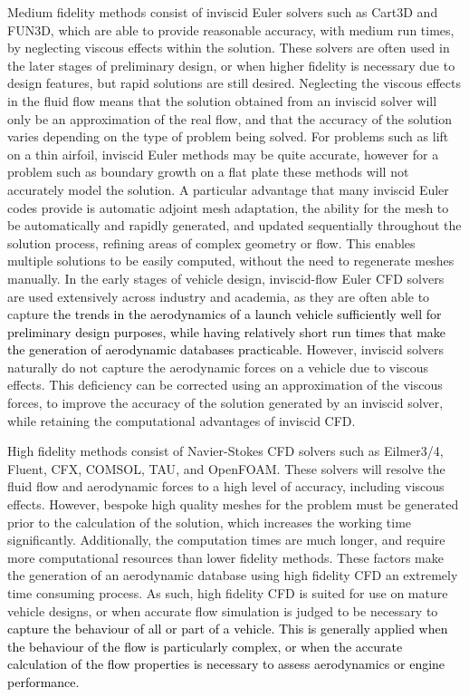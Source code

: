 Medium fidelity methods consist of inviscid Euler solvers such as Cart3D\cite{CART3D} and FUN3D\cite{fun3d}, which are able to provide reasonable accuracy, with medium run times, by neglecting viscous effects within the solution. These solvers are often used in the later stages of preliminary design, or when higher fidelity is necessary due to design features, but rapid solutions are still desired.  Neglecting the viscous effects in the fluid flow means that the solution obtained from an inviscid solver will only be an approximation of the real flow, and that the accuracy of the solution varies depending on the type of problem being solved. For problems such as lift on a thin airfoil, inviscid Euler methods may be quite accurate, however for a problem such as boundary growth on a flat plate these methods will not accurately model the solution\cite{NASAEuler}. A particular advantage that many inviscid Euler codes provide is automatic adjoint mesh adaptation, the ability for the mesh to be automatically and rapidly generated, and updated sequentially throughout the solution process, refining areas of complex geometry or flow. This enables multiple solutions to be easily computed, without the need to regenerate meshes manually. In the early stages of vehicle design, inviscid-flow Euler CFD solvers are used extensively across industry and academia\cite{Almosnino2016}, as they are often able to capture \textcolor{black}{the trends in the aerodynamics of a launch vehicle sufficiently well for preliminary design purposes, while having relatively short run times that make the generation of aerodynamic databases practicable.}
 However, inviscid solvers naturally do not capture the aerodynamic forces on a vehicle due to viscous effects. This deficiency can be corrected using an approximation of the viscous forces, to improve the accuracy of the solution generated by an inviscid solver, while retaining the computational advantages of inviscid CFD\cite{Ward2018}. 

High fidelity methods consist of Navier-Stokes CFD solvers such as Eilmer3/4\cite{Gollan2013b}, Fluent\cite{Ansys2014}, CFX\cite{CFX}, COMSOL\cite{comsol}, TAU\cite{Schwamborn2006}, and OpenFOAM\cite{openfoam}. These solvers will resolve the fluid flow and aerodynamic forces to a high level of accuracy, including viscous effects. However, bespoke high quality meshes for the problem must be generated prior to the calculation of the solution, which increases the working time significantly. Additionally, the computation times are much longer, and require more computational resources than lower fidelity methods. These factors make the generation of an aerodynamic database using high fidelity CFD an extremely time consuming process. As such, high fidelity CFD is suited for use on mature vehicle designs, or when accurate flow simulation is judged to be necessary to \textcolor{black}{capture the behaviour of all or part of a vehicle. This is generally applied when the behaviour of the flow is particularly complex, or when the accurate calculation of the flow properties is necessary to assess aerodynamics or engine performance.}




